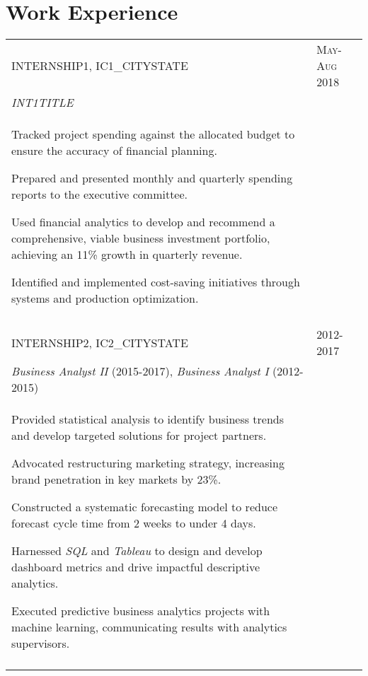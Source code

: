 \documentclass[a4paper,10pt]{article}
\begin{document}
\section{Work Experience}
\begin{supertabular}{p{13.9cm}>{\raggedleft\arraybackslash}p{3.4cm}}

	\textsc{INTERNSHIP1}, IC1_CITYSTATE
	& \textsc{May-Aug 2018} \\
	\small	\emph{INT1TITLE} & \\
	\begin{enumerate*}[label =$\circ$, itemjoin={\newline}]
		\item \footnotesize Tracked project spending against the allocated budget to ensure the accuracy of financial planning.
		\item \footnotesize Prepared and presented monthly and quarterly spending reports to the executive committee.
		\item \footnotesize Used financial analytics to develop and recommend a comprehensive, viable business investment portfolio, achieving an 11\% growth in quarterly revenue.
		\item \footnotesize Identified and implemented cost-saving initiatives through systems and production optimization.
	\end{enumerate*} & \\
	 \\




	\textsc{INTERNSHIP2}, IC2_CITYSTATE
	& \textsc{2012-2017} \\
	\small	\emph{Business Analyst II} (2015-2017), \emph{Business Analyst I} (2012-2015) & \\
	\begin{enumerate*}[label =$\circ$, itemjoin={\newline}]
		\item \footnotesize Provided statistical analysis to identify business trends and develop targeted solutions for project partners.
		\item \footnotesize	Advocated restructuring marketing strategy, increasing brand penetration in key markets by 23\%.
		\item \footnotesize Constructed a systematic forecasting model to reduce forecast cycle time from 2 weeks to under 4 days.
		\item \footnotesize Harnessed \emph{SQL} and \emph{Tableau} to design and develop dashboard metrics and drive impactful descriptive analytics.
		\item \footnotesize Executed predictive business analytics projects with machine learning, communicating results with analytics supervisors.
	\end{enumerate*} & \\
	 \\


\end{supertabular}
\end{document}
